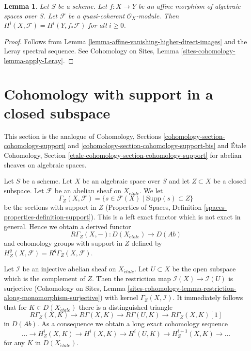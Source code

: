 \documentclass{stacks-project}
\theoremstyle{plain}
\newtheorem{lemma}[subsection]{Lemma}
\theoremstyle{definition}
\theoremstyle{remark}
\numberwithin{equation}{subsection}
\def\etale{{\acute{e}tale}}
\begin{document}
\begin{lemma}
\label{lemma-relative-affine-cohomology}
Let $S$ be a scheme. Let $f : X \to Y$ be an affine
morphism of algebraic spaces over $S$.
Let $\mathcal{F}$ be a quasi-coherent $\mathcal{O}_X$-module.
Then $H^i(X, \mathcal{F}) = H^i(Y, f_*\mathcal{F})$ for all $i \geq 0$.
\end{lemma}

\begin{proof}
Follows from Lemma \ref{lemma-affine-vanishing-higher-direct-images}
and the Leray spectral sequence. See
Cohomology on Sites, Lemma \ref{sites-cohomology-lemma-apply-Leray}.
\end{proof}






\section{Cohomology with support in a closed subspace}
\label{section-cohomology-support}

\noindent
This section is the analogue of Cohomology, Sections
\ref{cohomology-section-cohomology-support} and
\ref{cohomology-section-cohomology-support-bis}
and \'Etale Cohomology, Section
\ref{etale-cohomology-section-cohomology-support}
for abelian sheaves on algebraic spaces.

\medskip\noindent
Let $S$ be a scheme.
Let $X$ be an algebraic space over $S$ and let $Z \subset X$ be a closed
subspace. Let $\mathcal{F}$ be an abelian sheaf on $X_\etale$. We let
$$
\Gamma_Z(X, \mathcal{F}) =
\{s \in \mathcal{F}(X) \mid \text{Supp}(s) \subset Z\}
$$
be the sections with support in $Z$
(Properties of Spaces, Definition \ref{spaces-properties-definition-support}).
This is a left exact functor which is not exact in general.
Hence we obtain a derived functor
$$
R\Gamma_Z(X, -) : D(X_\etale) \longrightarrow D(\textit{Ab})
$$
and cohomology groups with support in $Z$ defined by
$H^q_Z(X, \mathcal{F}) = R^q\Gamma_Z(X, \mathcal{F})$.

\medskip\noindent
Let $\mathcal{I}$ be an injective abelian sheaf on $X_\etale$. Let
$U \subset X$ be the open subspace which is the complement of $Z$.
Then the restriction map $\mathcal{I}(X) \to \mathcal{I}(U)$ is surjective
(Cohomology on Sites, Lemma
\ref{sites-cohomology-lemma-restriction-along-monomorphism-surjective})
with kernel $\Gamma_Z(X, \mathcal{I})$. It immediately follows that
for $K \in D(X_\etale)$ there is a distinguished triangle
$$
R\Gamma_Z(X, K) \to R\Gamma(X, K) \to R\Gamma(U, K) \to R\Gamma_Z(X, K)[1]
$$
in $D(\textit{Ab})$. As a consequence we obtain a long exact cohomology
sequence
$$
\ldots \to H^i_Z(X, K) \to H^i(X, K) \to H^i(U, K) \to
H^{i + 1}_Z(X, K) \to \ldots
$$
for any $K$ in $D(X_\etale)$.
\end{document}
